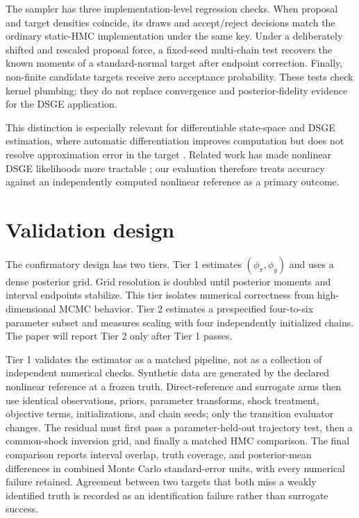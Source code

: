 \documentclass[11pt]{article}
\begin{document}
The sampler has three implementation-level regression checks. When proposal and
target densities coincide, its draws and accept/reject decisions match the
ordinary static-HMC implementation under the same key. Under a deliberately
shifted and rescaled proposal force, a fixed-seed multi-chain test recovers the
known moments of a standard-normal target after endpoint correction. Finally,
non-finite candidate targets receive zero acceptance probability. These tests
check kernel plumbing; they do not replace convergence and posterior-fidelity
evidence for the DSGE application.

This distinction is especially relevant for differentiable state-space and
DSGE estimation, where automatic differentiation improves computation but does
not resolve approximation error in the target \citep{childers2022differentiable}.
Related work has made nonlinear DSGE likelihoods more tractable
\citep{kollmann2017tractable}; our evaluation therefore treats accuracy against
an independently computed nonlinear reference as a primary outcome.

\section{Validation design}

The confirmatory design has two tiers. Tier 1 estimates $(\phi_\pi,\phi_y)$ and
uses a dense posterior grid. Grid resolution is doubled until posterior moments
and interval endpoints stabilize. This tier isolates numerical correctness from
high-dimensional MCMC behavior. Tier 2 estimates a prespecified four-to-six
parameter subset and measures scaling with four independently initialized
chains. The paper will report Tier 2 only after Tier 1 passes.

Tier 1 validates the estimator as a matched pipeline, not as a collection of
independent numerical checks. Synthetic data are generated by the declared
nonlinear reference at a frozen truth. Direct-reference and surrogate arms then
use identical observations, priors, parameter transforms, shock treatment,
objective terms, initializations, and chain seeds; only the transition evaluator
changes. The residual must first pass a parameter-held-out trajectory test, then
a common-shock inversion grid, and finally a matched HMC comparison. The final
comparison reports interval overlap, truth coverage, and posterior-mean
differences in combined Monte Carlo standard-error units, with every numerical
failure retained. Agreement between two targets that both miss a weakly
identified truth is recorded as an identification failure rather than surrogate
success.
\end{document}
